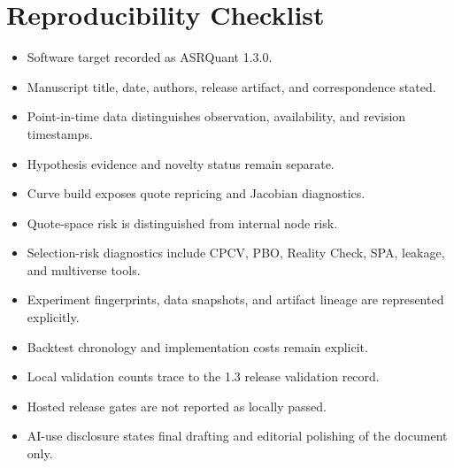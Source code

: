 \documentclass{asrpaper}
\begin{document}
\section{Reproducibility Checklist}
\begin{itemize}
\item Software target recorded as ASRQuant 1.3.0.
\item Manuscript title, date, authors, release artifact, and correspondence stated.
\item Point-in-time data distinguishes observation, availability, and revision timestamps.
\item Hypothesis evidence and novelty status remain separate.
\item Curve build exposes quote repricing and Jacobian diagnostics.
\item Quote-space risk is distinguished from internal node risk.
\item Selection-risk diagnostics include CPCV, PBO, Reality Check, SPA, leakage, and multiverse tools.
\item Experiment fingerprints, data snapshots, and artifact lineage are represented explicitly.
\item Backtest chronology and implementation costs remain explicit.
\item Local validation counts trace to the 1.3 release validation record.
\item Hosted release gates are not reported as locally passed.
\item AI-use disclosure states final drafting and editorial polishing of the document only.
\end{itemize}
\end{document}
